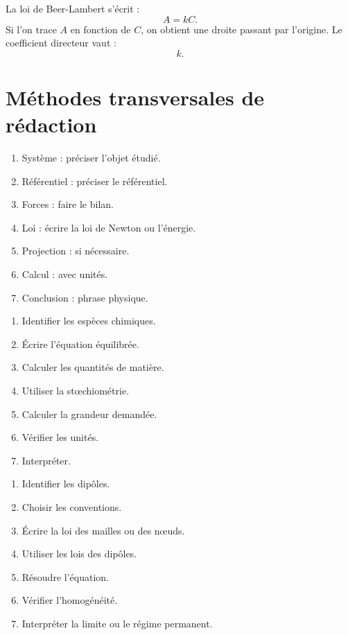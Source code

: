\documentclass[11pt,a4paper]{article}
\begin{document}
\begin{exemple}
La loi de Beer-Lambert s'écrit :
\[
A=kC.
\]
Si l'on trace $A$ en fonction de $C$, on obtient une droite passant par l'origine.  
Le coefficient directeur vaut :
\[
k.
\]
\end{exemple}

\section{Méthodes transversales de rédaction}

\begin{methode}
\begin{enumerate}
  \item Système : préciser l'objet étudié.
  \item Référentiel : préciser le référentiel.
  \item Forces : faire le bilan.
  \item Loi : écrire la loi de Newton ou l'énergie.
  \item Projection : si nécessaire.
  \item Calcul : avec unités.
  \item Conclusion : phrase physique.
\end{enumerate}
\end{methode}

\begin{methode}
\begin{enumerate}
  \item Identifier les espèces chimiques.
  \item Écrire l'équation équilibrée.
  \item Calculer les quantités de matière.
  \item Utiliser la stœchiométrie.
  \item Calculer la grandeur demandée.
  \item Vérifier les unités.
  \item Interpréter.
\end{enumerate}
\end{methode}

\begin{methode}
\begin{enumerate}
  \item Identifier les dipôles.
  \item Choisir les conventions.
  \item Écrire la loi des mailles ou des nœuds.
  \item Utiliser les lois des dipôles.
  \item Résoudre l'équation.
  \item Vérifier l'homogénéité.
  \item Interpréter la limite ou le régime permanent.
\end{enumerate}
\end{methode}
\end{document}
